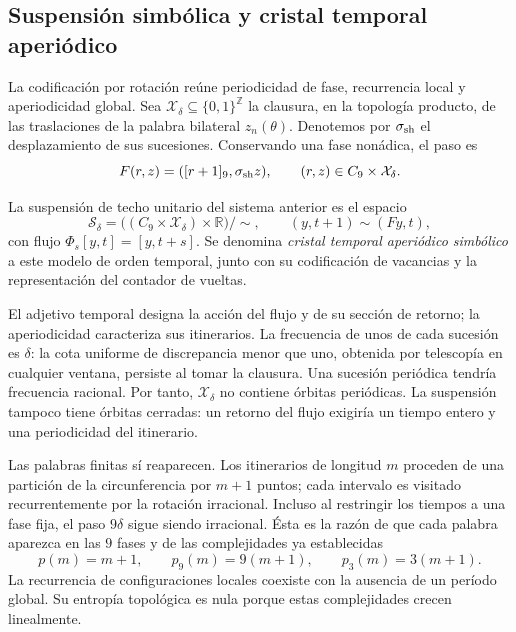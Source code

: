 \subsection{Suspensión simbólica y cristal temporal aperiódico}
\label{x_reciprocidad:mono-ampl:cristal}

La codificación por rotación reúne periodicidad de fase, recurrencia local
y aperiodicidad global. Sea \(\mathcal X_\delta\subseteq\{0,1\}^{\mathbb Z}\)
la clausura, en la topología producto, de las traslaciones de la palabra
bilateral \(z_n(\theta)\). Denotemos por \(\sigma_{\rm sh}\) el
desplazamiento de sus sucesiones. Conservando una fase nonádica, el paso es
\[
 F(r,z)=([r+1]_9,\sigma_{\rm sh}z),\qquad
 (r,z)\in C_9\times\mathcal X_\delta.
\]

\begin{definition}
\label{x_reciprocidad:mono-ampl:def-cristal}
La suspensión de techo unitario del sistema anterior es el espacio
\[
 \mathcal S_\delta=
 \bigl((C_9\times\mathcal X_\delta)\times\mathbb R\bigr)/\sim,
 \qquad (y,t+1)\sim(Fy,t),
\]
con flujo \(\Phi_s[y,t]=[y,t+s]\). Se denomina \emph{cristal temporal
aperiódico simbólico} a este modelo de orden temporal, junto con su
codificación de vacancias y la representación del contador de vueltas.
\end{definition}

El adjetivo temporal designa la acción del flujo y de su sección de retorno;
la aperiodicidad caracteriza sus itinerarios. La frecuencia de unos de cada
sucesión es \(\delta\): la cota uniforme de discrepancia menor que uno,
obtenida por telescopía en cualquier ventana, persiste al tomar la clausura.
Una sucesión periódica tendría frecuencia racional. Por tanto,
\(\mathcal X_\delta\) no contiene órbitas periódicas. La suspensión
tampoco tiene órbitas cerradas: un retorno del flujo exigiría un tiempo
entero y una periodicidad del itinerario.

Las palabras finitas sí reaparecen. Los itinerarios de longitud \(m\)
proceden de una partición de la circunferencia por \(m+1\) puntos; cada
intervalo es visitado recurrentemente por la rotación irracional. Incluso
al restringir los tiempos a una fase fija, el paso \(9\delta\) sigue
siendo irracional. Ésta es la razón de que cada palabra aparezca en las
\(9\) fases y de las complejidades ya establecidas
\[
 p(m)=m+1,\qquad p_9(m)=9(m+1),\qquad p_3(m)=3(m+1).
\]
La recurrencia de configuraciones locales coexiste con la ausencia de un
período global. Su entropía topológica es nula porque estas complejidades
crecen linealmente.

